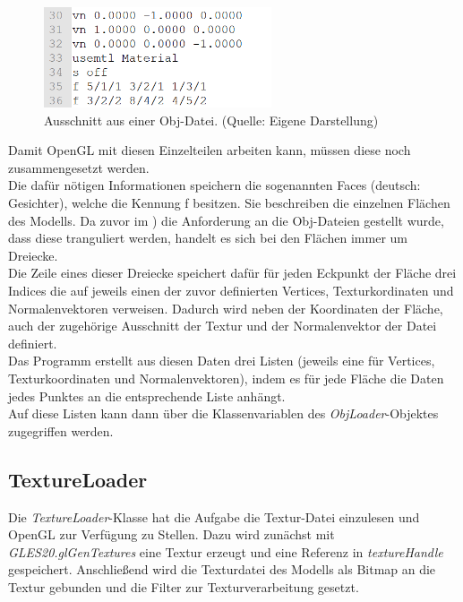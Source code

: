 \begin{figure}
\centering
\includegraphics[width=0.6\textwidth]{Abbildungen/obj-datei.png}
\caption[Obj-Dateiformat]{Ausschnitt aus einer Obj-Datei. (Quelle: Eigene Darstellung)}
\label{fig:obj-datei}
\end{figure}
Damit OpenGL mit diesen Einzelteilen arbeiten kann, müssen diese noch zusammengesetzt werden. \\
Die dafür nötigen Informationen speichern die sogenannten Faces (deutsch: \glqq Gesichter\grqq ), welche die Kennung f besitzen. Sie beschreiben die einzelnen Flächen des Modells. Da zuvor im ) die Anforderung an die Obj-Dateien gestellt wurde, dass diese tranguliert werden, handelt es sich bei den Flächen immer um Dreiecke. \\ 
Die Zeile eines dieser Dreiecke speichert dafür für jeden Eckpunkt der Fläche drei Indices die auf jeweils einen der  zuvor definierten Vertices, Texturkordinaten und Normalenvektoren verweisen. Dadurch wird neben der Koordinaten der Fläche, auch der zugehörige Ausschnitt der Textur und der Normalenvektor der Datei definiert. \\
Das Programm erstellt aus diesen Daten drei Listen (jeweils eine für Vertices, Texturkoordinaten und Normalenvektoren), indem es für jede Fläche die Daten jedes Punktes an die entsprechende Liste anhängt.\\
Auf diese Listen kann dann über die Klassenvariablen des \textit{ObjLoader}-Objektes zugegriffen werden.

\subsection{TextureLoader}\label{sec:textureloader}
Die \textit{TextureLoader}-Klasse hat die Aufgabe die Textur-Datei einzulesen und OpenGL zur Verfügung zu Stellen. Dazu wird zunächst mit \textit{GLES20.glGenTextures} eine Textur erzeugt und eine Referenz in \textit{textureHandle} gespeichert. Anschließend wird die Texturdatei des Modells als Bitmap an die Textur gebunden und die Filter zur Texturverarbeitung gesetzt. 

